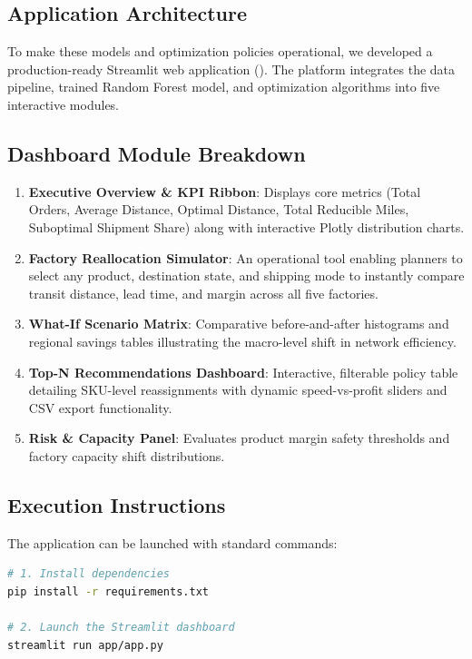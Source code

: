 \documentclass[12pt]{article}
\newcommand{\code}[1]{\colorbox{inlinecodebg}{\texttt{\textbf{\detokenize{#1}}}}}
\begin{document}
\subsection{Application Architecture}

To make these models and optimization policies operational, we developed a production-ready Streamlit web application (\code{app/app.py}). The platform integrates the data pipeline, trained Random Forest model, and optimization algorithms into five interactive modules.

\subsection{Dashboard Module Breakdown}

\begin{enumerate}
    \item \textbf{Executive Overview \& KPI Ribbon}: Displays core metrics (Total Orders, Average Distance, Optimal Distance, Total Reducible Miles, Suboptimal Shipment Share) along with interactive Plotly distribution charts.
    \item \textbf{Factory Reallocation Simulator}: An operational tool enabling planners to select any product, destination state, and shipping mode to instantly compare transit distance, lead time, and margin across all five factories.
    \item \textbf{What-If Scenario Matrix}: Comparative before-and-after histograms and regional savings tables illustrating the macro-level shift in network efficiency.
    \item \textbf{Top-N Recommendations Dashboard}: Interactive, filterable policy table detailing SKU-level reassignments with dynamic speed-vs-profit sliders and CSV export functionality.
    \item \textbf{Risk \& Capacity Panel}: Evaluates product margin safety thresholds and factory capacity shift distributions.
\end{enumerate}

\subsection{Execution Instructions}

The application can be launched with standard commands:
\begin{lstlisting}[language=bash]
# 1. Install dependencies
pip install -r requirements.txt

# 2. Launch the Streamlit dashboard
streamlit run app/app.py
\end{lstlisting}
\end{document}
